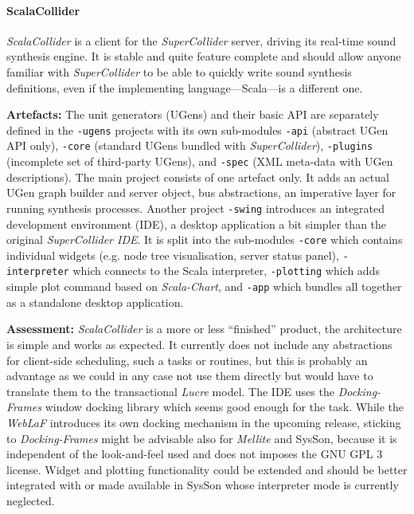 \documentclass[11pt,a4paper]{article}
\newcommand{\software}[1]{\textit{#1}}
\newcommand{\sysson}[0]{SysSon}
\begin{document}
\paragraph{ScalaCollider}

\software{ScalaCollider} is a client for the \software{SuperCollider} server, driving its real-time sound synthesis engine. It is stable and quite feature complete and should allow anyone familiar with \software{SuperCollider} to be able to quickly write sound synthesis definitions, even if the implementing language---Scala---is a different one.

\textbf{Artefacts:} The unit generators (UGens) and their basic API are separately defined in the \verb!-ugens! projects with its own sub-modules \verb!-api! (abstract UGen API only), \verb!-core! (standard UGens bundled with \software{SuperCollider}), \verb!-plugins! (incomplete set of third-party UGens), and \verb!-spec! (XML meta-data with UGen descriptions). The main project consists of one artefact only. It adds an actual UGen graph builder and server object, bus abstractions, an imperative layer for running synthesis processes. Another project \verb!-swing! introduces an integrated development environment (IDE), a desktop application a bit simpler than the original \software{SuperCollider IDE}. It is split into the sub-modules \verb!-core! which contains individual widgets (e.g. node tree visualisation, server status panel), \verb!-interpreter! which connects to the Scala interpreter, \verb!-plotting! which adds simple plot command based on \software{Scala-Chart}, and \verb!-app! which bundles all together as a standalone desktop application.

\textbf{Assessment:} \software{ScalaCollider} is a more or less ``finished'' product, the architecture is simple and works as expected. It currently does not include any abstractions for client-side scheduling, such a tasks or routines, but this is probably an advantage as we could in any case not use them directly but would have to translate them to the transactional \software{Lucre} model. The IDE uses the \software{Docking-Frames} window docking library which seems good enough for the task. While the \software{WebLaF} introduces its own docking mechanism in the upcoming release, sticking to \software{Docking-Frames} might be advisable also for \software{Mellite} and \sysson{}, because it is independent of the look-and-feel used and does not imposes the GNU GPL 3 license. Widget and plotting functionality could be extended and should be better integrated with or made available in \sysson{} whose interpreter mode is currently neglected.
\end{document}
